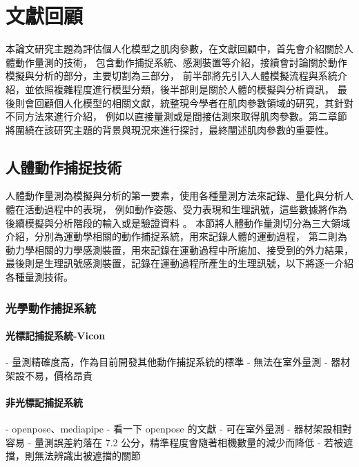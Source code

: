 \chapter{文獻回顧}
\fontsize{12pt}{18pt}\selectfont %

本論文研究主題為評估個人化模型之肌肉參數，在文獻回顧中，首先會介紹關於人體動作量測的技術，
包含動作捕捉系統、感測裝置等介紹，接續會討論關於動作模擬與分析的部分，主要切割為三部分，
前半部將先引入人體模擬流程與系統介紹，並依照複雜程度進行模型分類，後半部則是關於人體的模擬與分析資訊，
最後則會回顧個人化模型的相關文獻，統整現今學者在肌肉參數領域的研究，其針對不同方法來進行介紹，
例如以直接量測或是間接估測來取得肌肉參數。第二章節將圍繞在該研究主題的背景與現況來進行探討，最終闡述肌肉參數的重要性。

\section{人體動作捕捉技術}
人體動作量測為模擬與分析的第一要素，使用各種量測方法來記錄、量化與分析人體在活動過程中的表現，
例如動作姿態、受力表現和生理訊號，這些數據將作為後續模擬與分析階段的輸入或是驗證資料 \cite{taborri2020sport}。
本節將人體動作量測切分為三大領域介紹，分別為運動學相關的動作捕捉系統，用來記錄人體的運動過程，
第二則為動力學相關的力學感測裝置，用來記錄在運動過程中所施加、接受到的外力結果，
最後則是生理訊號感測裝置，記錄在運動過程所產生的生理訊號，以下將逐一介紹各種量測技術。

\subsection{光學動作捕捉系統}

\subsubsection{光標記捕捉系統-Vicon}
- 量測精確度高，作為目前開發其他動作捕捉系統的標準
- 無法在室外量測
- 器材架設不易，價格昂貴

\subsubsection{非光標記捕捉系統}
- openpose、mediapipe
    - 看一下 openpose 的文獻
    - 可在室外量測
    - 器材架設相對容易
    - 量測誤差約落在 7.2 公分，精準程度會隨著相機數量的減少而降低
    - 若被遮擋，則無法辨識出被遮擋的關節


